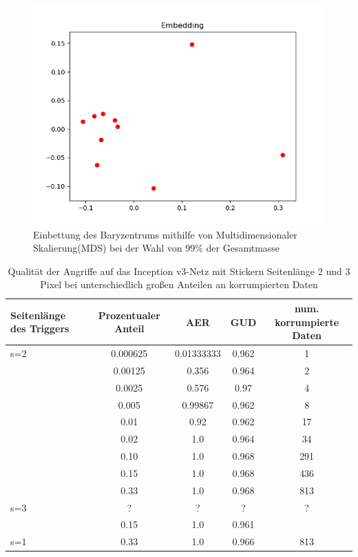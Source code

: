 \documentclass[twoside, 11pt,a4paper]{article}
\numberwithin{equation}{section}
\begin{document}
	\begin{figure}[h]
		\begin{center}
			\includegraphics[width=0.5\textheight]{bary_embedding99.png}
			\caption{Einbettung des Baryzentrums mithilfe von Multidimensionaler Skalierung(MDS) bei der Wahl von $99\%$ der Gesamtmasse}
		\end{center}
	\end{figure}
	
	
	
	
	\begin{table}[ht]
		
		
		\begin{center}
			\begin{tabular}{|l|c|c|c|c|}
				\hline
				Seitenlänge des Triggers& Prozentualer Anteil & AER & GUD & num. korrumpierte Daten \\ \hline
				s=2 & 0.000625 & 0.01333333  & 0.962  & 1 \\
				& 0.00125 & 0.356  & 0.964  & 2 \\
				& 0.0025 & 0.576 & 0.97 & 4 \\
				& 0.005 & 0.99867 & 0.962 & 8 \\
				& 0.01 & 0.92 & 0.962 & 17 \\
				& 0.02 & 1.0 & 0.964 & 34\\ 
				& 0.10 & 1.0 & 0.968 & 291\\
				& 0.15 & 1.0 & 0.968 & 436 \\ 
				& 0.33 & 1.0 & 0.968 & 813 \\ \hline
				s=3 & ? & ? & ? &? \\ 
				& 0.15 & 1.0 & 0.961& \\ \hline
				s=1 & 0.33 & 1.0 & 0.966 & 813 \\ \hline
			\end{tabular}
			\caption{Qualität der Angriffe auf das Inception v3-Netz mit Stickern Seitenlänge 2 und 3 Pixel bei unterschiedlich großen Anteilen an korrumpierten Daten}
			\label{tab:SPA_incv3}	
		\end{center}
	\end{table}
\end{document}
